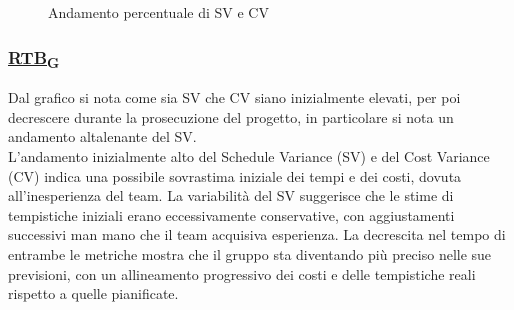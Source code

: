 \begin{figure*}[!h]
    \caption{Andamento percentuale di SV e CV}
\end{figure*}
\subsubsection*{\href{https://7last.github.io/docs/rtb/documentazione-interna/glossario\#requirements-and-technology-baseline}{RTB\textsubscript{G}}}
Dal grafico si nota come sia SV che CV siano inizialmente elevati, per poi decrescere durante la prosecuzione del progetto, in particolare si nota un andamento altalenante del SV. \\
L'andamento inizialmente alto del Schedule Variance (SV) e del Cost Variance (CV) indica una possibile sovrastima iniziale dei tempi e dei costi, dovuta all'inesperienza del team. La variabilità del SV suggerisce che le stime di tempistiche iniziali erano eccessivamente conservative, con aggiustamenti successivi man mano che il team acquisiva esperienza. La decrescita nel tempo di entrambe le metriche mostra che il gruppo sta diventando più preciso nelle sue previsioni, con un allineamento progressivo dei costi e delle tempistiche reali rispetto a quelle pianificate. 


\newpage
